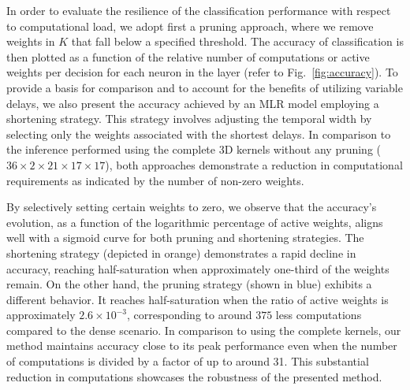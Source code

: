 \documentclass[default]{sn-jnl}%
\theoremstyle{thmstyleone}%
\theoremstyle{thmstyletwo}%
\theoremstyle{thmstylethree}%
\newcommand{\kernel}{K} %
\begin{document}
In order to evaluate the resilience of the classification performance with respect to computational load, we adopt first a pruning approach, where we remove weights in $\kernel$ that fall below a specified threshold. The accuracy of classification is then plotted as a function of the relative number of computations or active weights per decision for each neuron in the layer (refer to Fig.~\ref{fig:accuracy}). To provide a basis for comparison and to account for the benefits of utilizing variable delays, we also present the accuracy achieved by an MLR model employing a shortening strategy. This strategy involves adjusting the temporal width by selecting only the weights associated with the shortest delays. In comparison to the inference performed using the complete 3D kernels without any pruning ($36\times2\times21\times17\times17$), both approaches demonstrate a reduction in computational requirements as indicated by the number of non-zero weights.

By selectively setting certain weights to zero, we observe that the accuracy's evolution, as a function of the logarithmic percentage of active weights, aligns well with a sigmoid curve for both pruning and shortening strategies. The shortening strategy (depicted in orange) demonstrates a rapid decline in accuracy, reaching half-saturation when approximately one-third of the weights remain. On the other hand, the pruning strategy (shown in blue) exhibits a different behavior. It reaches half-saturation when the ratio of active weights is approximately $2.6\times 10^{-3}$, corresponding to around $375$ less computations compared to the dense scenario. In comparison to using the complete kernels, our method maintains accuracy close to its peak performance even when the number of computations is divided by a factor of up to around 31. This substantial reduction in computations showcases the robustness of the presented method.
%
%
%
\end{document}
